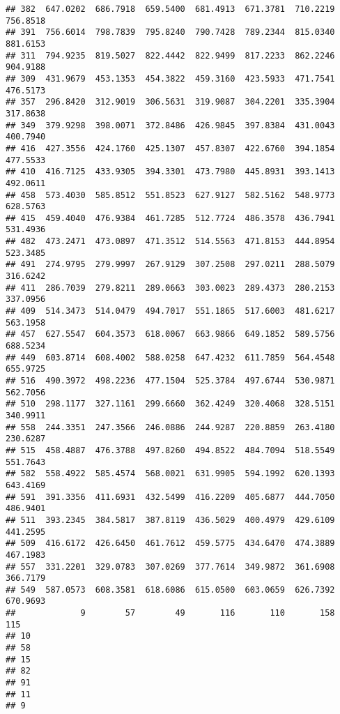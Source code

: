 \documentclass[
]{article}
\begin{document}
\begin{verbatim}
## 382  647.0202  686.7918  659.5400  681.4913  671.3781  710.2219  756.8518
## 391  756.6014  798.7839  795.8240  790.7428  789.2344  815.0340  881.6153
## 311  794.9235  819.5027  822.4442  822.9499  817.2233  862.2246  904.9188
## 309  431.9679  453.1353  454.3822  459.3160  423.5933  471.7541  476.5173
## 357  296.8420  312.9019  306.5631  319.9087  304.2201  335.3904  317.8638
## 349  379.9298  398.0071  372.8486  426.9845  397.8384  431.0043  400.7940
## 416  427.3556  424.1760  425.1307  457.8307  422.6760  394.1854  477.5533
## 410  416.7125  433.9305  394.3301  473.7980  445.8931  393.1413  492.0611
## 458  573.4030  585.8512  551.8523  627.9127  582.5162  548.9773  628.5763
## 415  459.4040  476.9384  461.7285  512.7724  486.3578  436.7941  531.4936
## 482  473.2471  473.0897  471.3512  514.5563  471.8153  444.8954  523.3485
## 491  274.9795  279.9997  267.9129  307.2508  297.0211  288.5079  316.6242
## 411  286.7039  279.8211  289.0663  303.0023  289.4373  280.2153  337.0956
## 409  514.3473  514.0479  494.7017  551.1865  517.6003  481.6217  563.1958
## 457  627.5547  604.3573  618.0067  663.9866  649.1852  589.5756  688.5234
## 449  603.8714  608.4002  588.0258  647.4232  611.7859  564.4548  655.9725
## 516  490.3972  498.2236  477.1504  525.3784  497.6744  530.9871  562.7056
## 510  298.1177  327.1161  299.6660  362.4249  320.4068  328.5151  340.9911
## 558  244.3351  247.3566  246.0886  244.9287  220.8859  263.4180  230.6287
## 515  458.4887  476.3788  497.8260  494.8522  484.7094  518.5549  551.7643
## 582  558.4922  585.4574  568.0021  631.9905  594.1992  620.1393  643.4169
## 591  391.3356  411.6931  432.5499  416.2209  405.6877  444.7050  486.9401
## 511  393.2345  384.5817  387.8119  436.5029  400.4979  429.6109  441.2595
## 509  416.6172  426.6450  461.7612  459.5775  434.6470  474.3889  467.1983
## 557  331.2201  329.0783  307.0269  377.7614  349.9872  361.6908  366.7179
## 549  587.0573  608.3581  618.6086  615.0500  603.0659  626.7392  670.9693
##             9        57        49       116       110       158       115
## 10                                                                       
## 58                                                                       
## 15                                                                       
## 82                                                                       
## 91                                                                       
## 11                                                                       
## 9                                                                        

\end{verbatim}
\end{document}
